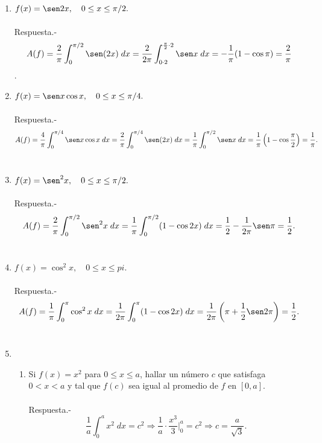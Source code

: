 \begin{enumerate}
\item $f(x)=\sen 2x,\quad 0\leq x \leq \pi/2.$\\\\
    Respuesta.-\; $$A(f) = \dfrac{2}{\pi}\int_0^{\pi/2}\sen(2x)\; dx =  \dfrac{2}{2\pi}\int_{0\cdot 2}^{\frac{\pi}{2}\cdot 2}  \sen x\; dx = -\dfrac{1}{\pi}(1 -\cos \pi) = \dfrac{2}{\pi}$$.\\

\item $f(x)=\sen x \cos x,\quad 0\leq x \leq \pi/4.$\\\\
    Respuesta.-\; $$A(f)=\dfrac{4}{\pi}\int_0^{\pi/4}\sen x \cos x\; dx = \dfrac{2}{\pi}\int_0^{\pi/4}\sen(2x)\; dx = \dfrac{1}{\pi}\int_0^{\pi/2}\sen x\; dx = \dfrac{1}{\pi}\left(1-\cos \dfrac{\pi}{2}\right) = \dfrac{1}{\pi}.$$\\

\item $f(x)=\sen^2 x, \quad 0\leq x \leq \pi/2.$\\\\
    Respuesta.-\; $$A(f) = \dfrac{2}{\pi}\int_0^{\pi/2} \sen^2 x \; dx = \dfrac{1}{\pi}\int_0^{\pi/2} (1-\cos 2x)\; dx = \dfrac{1}{2} - \dfrac{1}{2\pi}\sen \pi = \dfrac{1}{2}.$$\\

\item $f(x)=\cos^2 x, \quad 0\leq x \leq pi.$\\\\
    Respuesta.-\; $$A(f) = \dfrac{1}{\pi}\int_0^{\pi}\cos^2 x\; dx = \dfrac{1}{2\pi}\int_0^\pi (1-\cos 2x)\; dx = \dfrac{1}{2\pi}\left(\pi + \dfrac{1}{2}\sen 2\pi\right) = \dfrac{1}{2}.$$\\

\item 
    \begin{enumerate}[\bfseries (a)]

	\item Si $f(x)=x^2$ para $0\leq x \leq a$, hallar un número $c$ que satisfaga $0<x<a$ y tal que $f(c)$ sea igual al promedio de $f$ en $[0,a].$\\\\
	    Respuesta.-\; $$\dfrac{1}{a}\int_0^a x^2\; dx = c^2 \Longrightarrow \dfrac{1}{a}\cdot \dfrac{x^3}{3}\bigg|_0^a = c^2 \Longrightarrow c = \dfrac{a}{\sqrt{3}}.$$\\


\end{enumerate}
\end{enumerate}
